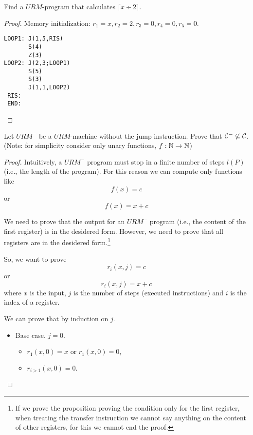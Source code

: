 \documentclass[12pt,a4paper,oneside]{book}
\begin{document}
\begin{exercise}
    Find a $URM$-program that calculates $\lceil x \div 2 \rceil$.

    \begin{proof}
        Memory initialization: $r_1 = x, r_2 = 2, r_3 = 0, r_4 = 0, r_5 = 0$.

\begin{verbatim}
LOOP1: J(1,5,RIS)
       S(4)
       Z(3)
LOOP2: J(2,3;LOOP1)
       S(5)
       S(3)
       J(1,1,LOOP2)
 RIS:
 END:
\end{verbatim}
    \end{proof}
\end{exercise}

\begin{exercise}
    Let $URM^-$ be a $URM$-machine without the jump instruction.
    Prove that $\mathcal{C}^- \not\subseteq \mathcal{C}$. (Note: for simplicity consider only unary functions, $f: \mathbb{N} \to \mathbb{N}$)

    \begin{proof}
        Intuitively, a $URM^-$ program must stop in a finite number of steps $l(P)$ (i.e., the length of the program).
        For this reason we can compute only functions like
        \[ f(x) = c \]
        or
        \[ f(x) = x + c \]

        We need to prove that the output for an $URM^-$ program (i.e., the content of the first register) is in the desidered form.
        However, we need to prove that all registers are in the desidered form.\footnote{If we prove the proposition proving the condition only for the first register, when treating the transfer instruction we cannot say anything on the content of other registers, for this we cannot end the proof.}

        So, we want to prove
        \[ r_i(x, j) = c \]
        or
        \[ r_i(x, j) = x + c \]
        where $x$ is the input, $j$ is the number of steps (executed instructions) and $i$ is the index of a register.

        We can prove that by induction on $j$.
        \begin{itemize}
            \item Base case. $j = 0$.
            \begin{itemize}
                \item $r_1(x, 0) = x$ or $r_1(x, 0) = 0$,
                \item $r_{i > 1} (x, 0) = 0$.
            \end{itemize}


\end{itemize}
\end{proof}
\end{exercise}
\end{document}
